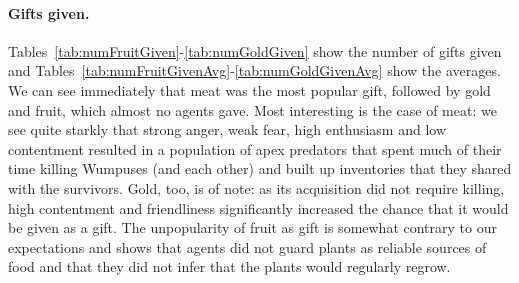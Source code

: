 \paragraph{Gifts given.} Tables~\ref{tab:numFruitGiven}-\ref{tab:numGoldGiven} show the number of gifts given and Tables~\ref{tab:numFruitGivenAvg}-\ref{tab:numGoldGivenAvg} show the averages. We can see immediately that meat was the most popular gift, followed by gold and fruit, which almost no agents gave. Most interesting is the case of meat: we see quite starkly that strong anger, weak fear, high enthusiasm and low contentment resulted in a population of apex predators that spent much of their time killing Wumpuses (and each other) and built up inventories that they shared with the survivors. Gold, too, is of note: as its acquisition did not require killing, high contentment and friendliness significantly increased the chance that it would be given as a gift. The unpopularity of fruit as gift is somewhat contrary to our expectations and shows that agents did not guard plants as reliable sources of food and that they did not infer that the plants would regularly regrow.

